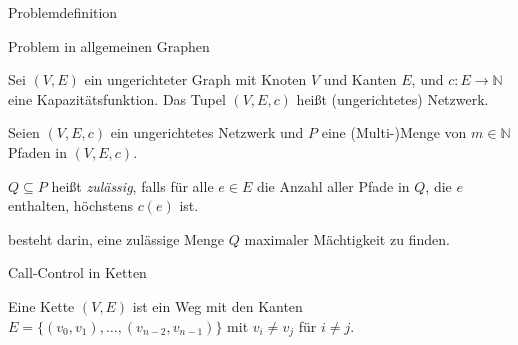 

\begin{section}{Problemdefinition}
	\begin{frame}{Problem in allgemeinen Graphen}
		\begin{definition}[Netzwerk]
			Sei $(V,E)$ ein ungerichteter Graph mit Knoten $V$ und Kanten $E$, und $c: E \to \mathbb{N}$ eine Kapazitätsfunktion.
			Das Tupel $(V,E,c)$ heißt (ungerichtetes) Netzwerk.
		\end{definition}
		\begin{definition}[\CallControl]
   			Seien $(V,E,c)$ ein ungerichtetes Netzwerk und $P$ eine (Multi-)Menge von $m \in \mathbb{N}$ Pfaden in $(V,E,c)$.

			$Q \subseteq P$ heißt {\em zulässig}, falls für alle $e \in E$ die Anzahl aller Pfade in $Q$,
			die $e$ enthalten, höchstens $c(e)$ ist.

			{\em \CallControl} besteht darin, eine zulässige Menge $Q$ maximaler Mächtigkeit zu finden.
		\end{definition}
	\end{frame}

	\begin{frame}{Call-Control in Ketten}
		\begin{definition}[Kette]
			Eine Kette $(V,E)$ ist ein Weg mit den Kanten $E=\{(v_0, v_1),\dots,(v_{n-2}, v_{n-1})\}$ mit $v_i \neq v_j$ für $i \neq j$.
		\end{definition}
	
		
	
	\end{frame}
\end{section}
